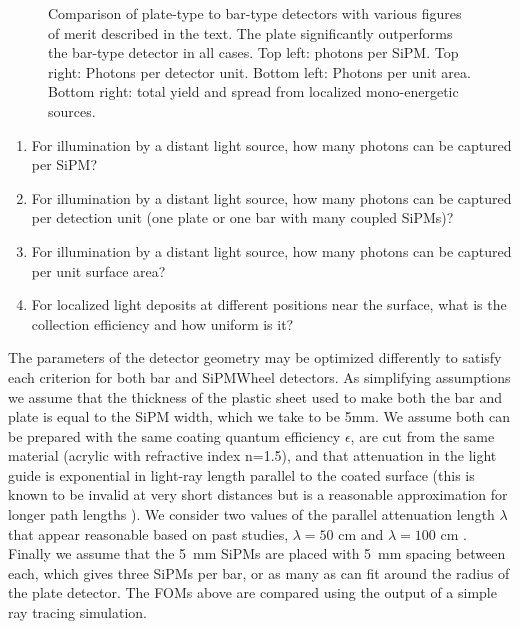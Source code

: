 \begin{figure}[t!]
\begin{centering}
\par\end{centering}

\caption{Comparison of plate-type to bar-type detectors with various figures of merit described in the text.  The plate significantly outperforms the bar-type detector in all cases. Top left: photons per SiPM. Top right: Photons per detector unit. Bottom left: Photons per unit area. Bottom right: total yield and spread from localized mono-energetic sources. \label{fig:FOMs}}
\end{figure}



\begin{enumerate}
\item For illumination by a distant light source, how many photons can be captured per SiPM?  
\item For illumination by a distant light source, how many photons can be captured per detection unit (one plate or one bar with many coupled SiPMs)?  
\item For illumination by a distant light source, how many photons can be captured per unit surface area?  
\item For localized light deposits at different positions near the surface, what is the collection efficiency and how uniform is it?
\end{enumerate}

The parameters of the detector geometry may be optimized differently to satisfy each criterion for both bar and SiPMWheel detectors.  As simplifying assumptions we assume that the thickness of the plastic sheet used to make both the bar and plate is equal to the SiPM width, which we take to be 5mm.  We assume both can be prepared with the same coating quantum efficiency $\epsilon$, are cut from the same material (acrylic with refractive index n=1.5), and that attenuation in the light guide is exponential in light-ray length parallel to the coated surface (this is known to be invalid at very short distances but is a reasonable approximation for longer path lengths \cite{Jones:2013sfa}).  We consider two values of the parallel attenuation length $\lambda$ that appear reasonable based on past studies, $\lambda=50$ cm and $\lambda=100$ cm \cite{Moss:2014ota,Jones:2013sfa}.  Finally we assume that the 5~mm SiPMs are placed with 5~mm spacing between each, which gives three SiPMs per bar, or as many as can fit around the radius of the plate detector.  The FOMs above are compared using the output of a simple ray tracing simulation.

